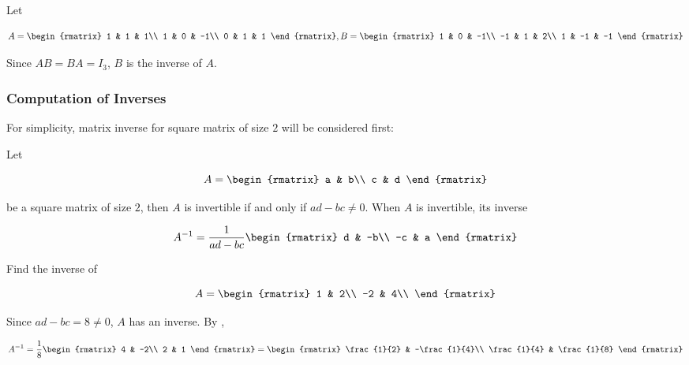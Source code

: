 \documentclass[a4paper,12pt]{article}
\begin{document}
\begin{exm}
  Let

  $$A=\begin{rmatrix}
    1 & 1 & 1\\
    1 & 0 & -1\\
    0 & 1 & 1
  \end{rmatrix},B=\begin{rmatrix}
    1 & 0 & -1\\
    -1 & 1 & 2\\
    1 & -1 & -1
  \end{rmatrix}$$\s

  Since $AB=BA=I_{3}$, $B$ is the inverse of $A$.
\end{exm}

\subsubsection{Computation of Inverses}
For simplicity, matrix inverse for square matrix of size $2$ will be considered first:\n

\begin{thm}
  Let

  $$A=\begin{rmatrix}
    a & b\\
    c & d
  \end{rmatrix}$$\s

  be a square matrix of size $2$, then $A$ is invertible if and only if $ad-bc\neq 0$. When $A$ is invertible, its inverse

  $$A^{-1}=\frac{1}{ad-bc}\begin{rmatrix}
    d & -b\\
    -c & a
  \end{rmatrix}$$
\end{thm}\n

\begin{exm}
  Find the inverse of
  
  $$A=\begin{rmatrix}
    1 & 2\\
    -2 & 4\\
  \end{rmatrix}$$\s

  \ans Since $ad-bc=8\neq 0$, $A$ has an inverse. By \rthm[\sctr{1}],

  $$A^{-1}=\frac{1}{8}\begin{rmatrix}
    4 & -2\\
    2 & 1
  \end{rmatrix}=\begin{rmatrix}
    \frac{1}{2} & -\frac{1}{4}\\
    \frac{1}{4} & \frac{1}{8}
  \end{rmatrix}$$
\end{exm}\n
\end{document}
